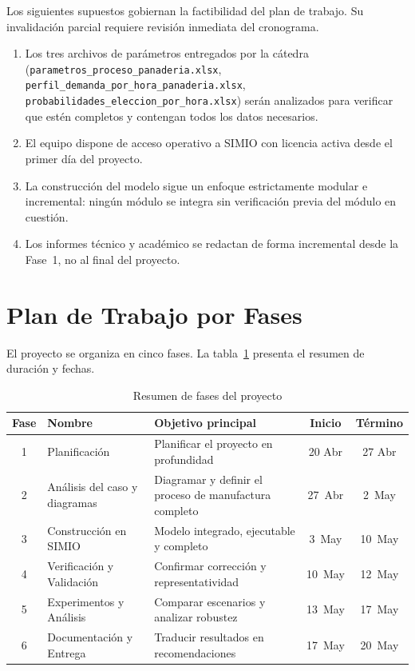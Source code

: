 \documentclass[12pt]{article}
\begin{document}
Los siguientes supuestos gobiernan la factibilidad del plan de trabajo. Su invalidación parcial requiere revisión inmediata del cronograma.

\begin{enumerate}
  \item Los tres archivos de parámetros entregados por la cátedra (\texttt{parametros\_proceso\_panaderia.xlsx}, \texttt{perfil\_demanda\_por\_hora\_panaderia.xlsx}, \texttt{probabilidades\_eleccion\_por\_hora.xlsx}) serán analizados para verificar que estén completos y contengan todos los datos necesarios.
  \item El equipo dispone de acceso operativo a SIMIO con licencia activa desde el primer día del proyecto.
  \item La construcción del modelo sigue un enfoque estrictamente modular e incremental: ningún módulo se integra sin verificación previa del módulo en cuestión.
  \item Los informes técnico y académico se redactan de forma incremental desde la Fase~1, no al final del proyecto.
\end{enumerate}
\newpage

\section{Plan de Trabajo por Fases}

El proyecto se organiza en cinco fases. La tabla~\ref{tab:resumen_fases} presenta el resumen de duración y fechas.

\begin{table}[h!]
\centering
\caption{Resumen de fases del proyecto}
\label{tab:resumen_fases}
\renewcommand{\arraystretch}{1.35}
\begin{tabularx}{\textwidth}{clXcc}
\toprule
\rowcolor{tabhead}\color{white}\textbf{Fase} & \color{white}\textbf{Nombre} & \color{white}\textbf{Objetivo principal} & \color{white}\textbf{Inicio} & \color{white}\textbf{Término} \\
\midrule
1 & Planificación & Planificar el proyecto en profundidad & 20 Abr & 27 Abr \\
\rowcolor{tabrow} 2 & Análisis del caso y diagramas  & Diagramar y definir el proceso de manufactura completo & 27~Abr & 2~May \\
3 & Construcción en SIMIO     & Modelo integrado, ejecutable y completo   & 3~May  & 10~May \\
\rowcolor{tabrow} 4 & Verificación y Validación & Confirmar corrección y representatividad  & 10~May & 12~May \\
5 & Experimentos y Análisis   & Comparar escenarios y analizar robustez   & 13~May & 17~May \\
\rowcolor{tabrow} 6 & Documentación y Entrega   & Traducir resultados en recomendaciones    & 17~May & 20~May \\
\bottomrule
\end{tabularx}
\end{table}
\end{document}
